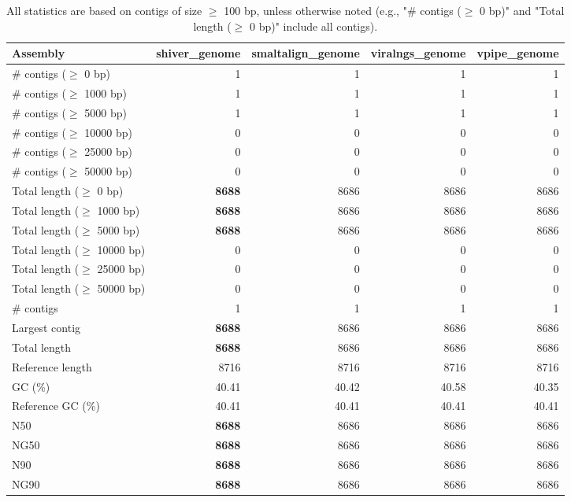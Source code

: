 \documentclass[12pt,a4paper]{article}
\begin{document}
\begin{table}[ht]
\begin{center}
\caption{All statistics are based on contigs of size $\geq$ 100 bp, unless otherwise noted (e.g., "\# contigs ($\geq$ 0 bp)" and "Total length ($\geq$ 0 bp)" include all contigs).}
\begin{tabular}{|l*{4}{|r}|}
\hline
Assembly & shiver\_genome & smaltalign\_genome & viralngs\_genome & vpipe\_genome \\ \hline
\# contigs ($\geq$ 0 bp) & 1 & 1 & 1 & 1 \\ \hline
\# contigs ($\geq$ 1000 bp) & 1 & 1 & 1 & 1 \\ \hline
\# contigs ($\geq$ 5000 bp) & 1 & 1 & 1 & 1 \\ \hline
\# contigs ($\geq$ 10000 bp) & 0 & 0 & 0 & 0 \\ \hline
\# contigs ($\geq$ 25000 bp) & 0 & 0 & 0 & 0 \\ \hline
\# contigs ($\geq$ 50000 bp) & 0 & 0 & 0 & 0 \\ \hline
Total length ($\geq$ 0 bp) & {\bf 8688} & 8686 & 8686 & 8686 \\ \hline
Total length ($\geq$ 1000 bp) & {\bf 8688} & 8686 & 8686 & 8686 \\ \hline
Total length ($\geq$ 5000 bp) & {\bf 8688} & 8686 & 8686 & 8686 \\ \hline
Total length ($\geq$ 10000 bp) & 0 & 0 & 0 & 0 \\ \hline
Total length ($\geq$ 25000 bp) & 0 & 0 & 0 & 0 \\ \hline
Total length ($\geq$ 50000 bp) & 0 & 0 & 0 & 0 \\ \hline
\# contigs & 1 & 1 & 1 & 1 \\ \hline
Largest contig & {\bf 8688} & 8686 & 8686 & 8686 \\ \hline
Total length & {\bf 8688} & 8686 & 8686 & 8686 \\ \hline
Reference length & 8716 & 8716 & 8716 & 8716 \\ \hline
GC (\%) & 40.41 & 40.42 & 40.58 & 40.35 \\ \hline
Reference GC (\%) & 40.41 & 40.41 & 40.41 & 40.41 \\ \hline
N50 & {\bf 8688} & 8686 & 8686 & 8686 \\ \hline
NG50 & {\bf 8688} & 8686 & 8686 & 8686 \\ \hline
N90 & {\bf 8688} & 8686 & 8686 & 8686 \\ \hline
NG90 & {\bf 8688} & 8686 & 8686 & 8686 \\ \hline

\end{tabular}
\end{center}
\end{table}
\end{document}
